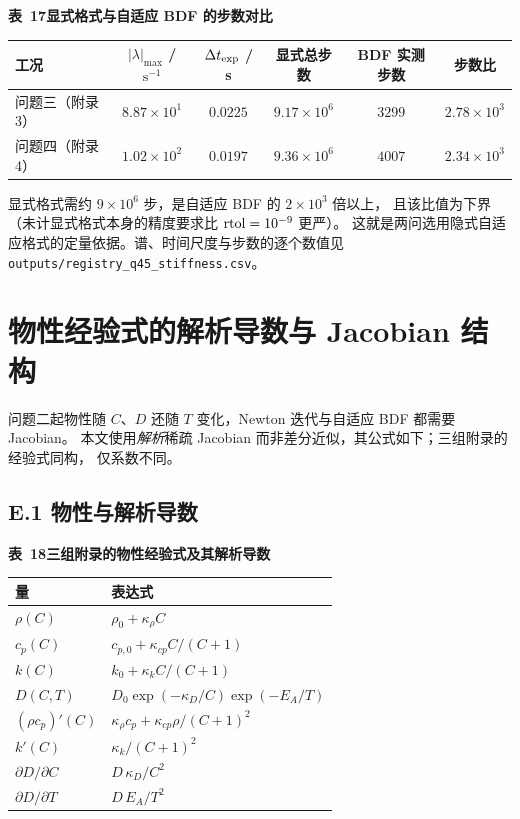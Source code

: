 \documentclass[withoutpreface,bwprint]{cumcmthesis} %
\begin{document}
\begin{appendices}
\begin{table}[htbp]
\centering
\begin{minipage}{0.94\textwidth}
\centering\small
\textbf{表~17\quad 显式格式与自适应 BDF 的步数对比}\\[3pt]
\begin{tabular}{lccccc}
\toprule
工况 & $|\lambda|_{\max}$ / $\mathrm{s^{-1}}$
 & $\Delta t_{\rm exp}$ / s & 显式总步数 & BDF 实测步数 & 步数比 \\
\midrule
问题三（附录 3） & $8.87\times10^{1}$ & $0.0225$ & $9.17\times10^{6}$ & $3299$ & $2.78\times10^{3}$ \\
问题四（附录 4） & $1.02\times10^{2}$ & $0.0197$ & $9.36\times10^{6}$ & $4007$ & $2.34\times10^{3}$ \\
\bottomrule
\end{tabular}
\end{minipage}
\end{table}

\noindent 显式格式需约 $9\times10^{6}$ 步，是自适应 BDF 的 $2\times10^{3}$ 倍以上，
且该比值为下界（未计显式格式本身的精度要求比 ${\rm rtol}=10^{-9}$ 更严）。
这就是两问选用隐式自适应格式的定量依据。谱、时间尺度与步数的逐个数值见
\texttt{outputs/registry\_q45\_stiffness.csv}。

\section{物性经验式的解析导数与 Jacobian 结构}
\label{app:jac}

问题二起物性随 $C$、$D$ 还随 $T$ 变化，Newton 迭代与自适应 BDF 都需要 Jacobian。
本文使用\emph{解析}稀疏 Jacobian 而非差分近似，其公式如下；三组附录的经验式同构，
仅系数不同。

\subsection*{E.1 物性与解析导数}

\begin{table}[htbp]
\centering
\begin{minipage}{0.94\textwidth}
\centering\small
\textbf{表~18\quad 三组附录的物性经验式及其解析导数}\\[3pt]
\begin{tabular}{ll}
\toprule
量 & 表达式 \\
\midrule
$\rho(C)$ & $\rho_0+\kappa_\rho C$ \\
$c_p(C)$ & $c_{p,0}+\kappa_{cp}C/(C+1)$ \\
$k(C)$ & $k_0+\kappa_kC/(C+1)$ \\
$D(C,T)$ & $D_0\exp(-\kappa_D/C)\exp(-E_A/T)$ \\
\midrule
$(\rho c_p)'(C)$ & $\kappa_\rho c_p+\kappa_{cp}\rho/(C+1)^2$ \\
$k'(C)$ & $\kappa_k/(C+1)^2$ \\
$\partial D/\partial C$ & $D\,\kappa_D/C^2$ \\
$\partial D/\partial T$ & $D\,E_A/T^2$ \\
\bottomrule
\end{tabular}
\end{minipage}
\end{table}


\end{appendices}
\end{document}
